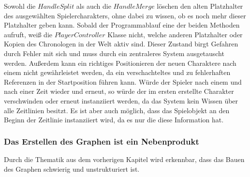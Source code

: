 Sowohl die $HandleSplit$ als auch die $HandleMerge$ löschen den alten Platzhalter des ausgewählten Spielercharakters, ohne dabei zu wissen, ob es noch mehr dieser Platzhalter geben kann. Sobald der Programmablauf eine der beiden Methoden aufruft, weiß die $PlayerController$ Klasse nicht, welche anderen Platzhalter oder Kopien des Chronologen in der Welt aktiv sind. Dieser Zustand birgt Gefahren durch Fehler mit sich und muss durch ein zentraleres System ausgetauscht werden. Außerdem kann ein richtiges Positionieren der neuen Charaktere nach einem  nicht gewährleistet werden, da ein verschachteltes  und  zu fehlerhaften Referenzen in der Startposition führen kann. Würde der Spieler nach einem   und nach einer Zeit wieder  und erneut,  so würde der im ersten  erstellte Charakter verschwinden oder erneut instanziiert werden, da das System kein Wissen über alle Zeitlinien besitzt. Es ist aber auch möglich, dass das Spielobjekt an den Beginn der Zeitlinie instanziiert wird, da es nur die diese Information hat.

\subsubsection{Das Erstellen des Graphen ist ein Nebenprodukt}
Durch die Thematik aus dem vorherigen Kapitel wird erkennbar, dass das Bauen des Graphen schwierig und unstrukturiert ist.

